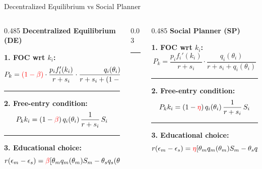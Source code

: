 \documentclass[9pt,xcolor={svgnames}]{beamer}
\begin{document}
\begin{frame}{Decentralized Equilibrium vs Social Planner}
\small
\vspace{2mm}
\begin{columns}[T,onlytextwidth]
\begin{column}{0.485\textwidth}
\textbf{Decentralized Equilibrium (DE)}
\vspace{0.3em}

\textbf{1. FOC wrt $k_i$:}
\[
P_k =\textcolor{red}{ (1-\beta)}\cdot
\frac{p_i f_i'(k_i)}{r+s_i}\cdot
\frac{q_i(\theta_i)}{r+s_i+(1-\beta)q_i(\theta_i)}
\]

\vspace{-0.3em}\hrule\vspace{0.6em}

\textbf{2. Free-entry condition:}
\[
P_k k_i = (1-\textcolor{red}{\beta})\, q_i(\theta_i)\,\frac{1}{r+s_i}\, S_i
\]

\vspace{-0.3em}\hrule\vspace{0.6em}

\textbf{3. Educational choice:}
\[
r(\epsilon_m-\epsilon_s)=\textcolor{red}{\beta}[\theta_m q_m(\theta_m) S_m
-\theta_s q_s(\theta_s) S_s]
\]
\end{column}

\begin{column}{0.03\textwidth}
\centering
\rule{0.4pt}{0.78\textheight}
\end{column}

\begin{column}{0.485\textwidth}
\textbf{Social Planner (SP)}
\vspace{0.3em}

\textbf{1. FOC wrt $k_i$:}
\[
P_k = 
\frac{p_i f_i'(k_i)}{r+s_i}\cdot
\frac{q_i(\theta_i)}{r+s_i+q_i(\theta_i)}
\]

\vspace{-0.3em}\hrule\vspace{0.6em}

\textbf{2. Free-entry condition:}
\[
P_k k_i = (1-\textcolor{red}{\eta})\, q_i(\theta_i)\,\frac{1}{r+s_i}\, S_i
\]

\vspace{-0.3em}\hrule\vspace{0.6em}

\textbf{3. Educational choice:}
\[
r(\epsilon_m-\epsilon_s)=\textcolor{red}{\eta}[\theta_m q_m(\theta_m) S_m
-\theta_s q_s(\theta_s) S_s]
\]



\end{column}
\end{columns}
\end{frame}
\end{document}

